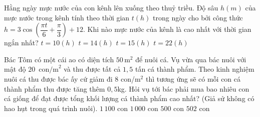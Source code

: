 \begin{ex}%
		Hằng ngày mực nước của con kênh lên xuống theo thuỷ triều. Độ sâu $h(m)$ của mực nước trong kênh tính theo thời gian $t(h)$ trong ngày cho bởi công thức $h = 3\cos\left(\dfrac{\pi t}{6} + \dfrac{\pi}{3}\right) + 12$. Khi nào mực nước của  kênh là cao nhất với thời gian ngắn nhất?
	\choice 
			{\True $t=10(h)$} 
			 {$t=14(h)$}
			{$t=15(h)$} 
			 {$t=22(h)$}
	\end{ex}

\begin{ex}%
		Bác Tôm có một cái ao có diện tích $50\,\mathrm{m}^2$ để nuôi cá. Vụ vừa qua bác nuôi với mật độ $20\,\text{ con/m}^2$ và thu được tất cả $1{,}5$ tấn cá thành phẩm. Theo kinh nghiệm nuôi cá thu được bác ấy cứ giảm đi $8$ con/m$^2$ thì tương ứng sẽ có mỗi con cá thành phẩm thu  được tăng thêm $0{,}5$kg. Hỏi vụ tới bác phải mua bao nhiêu con cá giống để đạt được tổng khối lượng cá thành phẩm cao nhất? (Giả sử không có hao hụt trong quá trình nuôi).
	\choice 
			{\True  $1\,100$ con}
			{$1\,000$ con} 
			{$500$ con} 
			{$502$  con}
	\end{ex}


